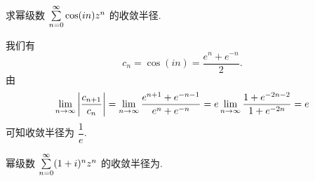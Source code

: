 \begin{example}
	求幂级数 $\sum\limits_{n=0}^\infty\cos(in)z^n$ 的收敛半径.
\end{example}

\begin{solution}
	我们有
	\[
		c_n=\cos(in)=\dfrac{e^n+e^{-n}}2.
	\]
	由
	\[
		 \lim_{n\to\infty}\left|\frac{c_{n+1}}{c_n}\right|
		=\lim_{n\to\infty}\frac{e^{n+1}+e^{-n-1}}{e^n+e^{-n}}=e\lim_{n\to\infty}\frac{1+e^{-2n-2}}{1+e^{-2n}}=e
	\]
	可知收敛半径为 $\dfrac1e$.
\end{solution}

\begin{exercise}
	幂级数 $\sum\limits_{n=0}^\infty(1+i)^nz^n$ 的收敛半径为\fillblank[2cm]{}.
\end{exercise}

% 
% 
% 

% 
% 

% 

